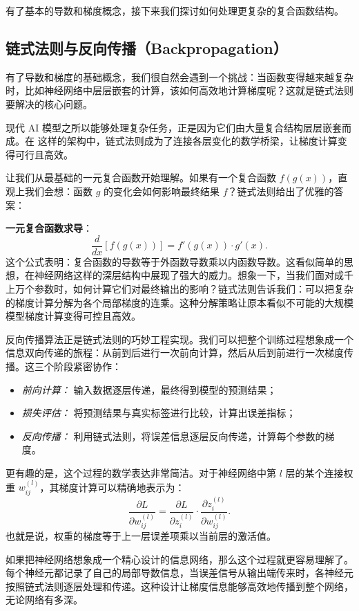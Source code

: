 有了基本的导数和梯度概念，接下来我们探讨如何处理更复杂的复合函数结构。

\subsection{链式法则与反向传播（Backpropagation）}

有了导数和梯度的基础概念，我们很自然会遇到一个挑战：当函数变得越来越复杂时，比如神经网络中层层嵌套的计算，该如何高效地计算梯度呢？这就是链式法则要解决的核心问题。

现代 AI 模型之所以能够处理复杂任务，正是因为它们由大量复合结构层层嵌套而成。在
这样的架构中，链式法则成为了连接各层变化的数学桥梁，让梯度计算变得可行且高效。

让我们从最基础的一元复合函数开始理解。如果有一个复合函数 $f(g(x))$，直观上我们会想：函数 $g$ 的变化会如何影响最终结果 $f$？链式法则给出了优雅的答案：

\textbf{一元复合函数求导}：
$$\frac{d}{dx}[f(g(x))] = f'(g(x)) \cdot g'(x).$$
这个公式表明：复合函数的导数等于外函数导数乘以内函数导数。这看似简单的思想，在神经网络这样的深层结构中展现了强大的威力。想象一下，当我们面对成千上万个参数时，如何计算它们对最终输出的影响？链式法则告诉我们：可以把复杂的梯度计算分解为各个局部梯度的连乘。这种分解策略让原本看似不可能的大规模模型梯度计算变得可控且高效。

反向传播算法正是链式法则的巧妙工程实现。我们可以把整个训练过程想象成一个信息双向传递的旅程：从前到后进行一次前向计算，然后从后到前进行一次梯度传播。这三个阶段紧密协作：

\begin{itemize}
  \item \emph{前向计算：} 输入数据逐层传递，最终得到模型的预测结果；
  \item \emph{损失评估：} 将预测结果与真实标签进行比较，计算出误差指标；
  \item \emph{反向传播：} 利用链式法则，将误差信息逐层反向传递，计算每个参数的梯度。
\end{itemize}

更有趣的是，这个过程的数学表达非常简洁。对于神经网络中第 $l$ 层的某个连接权重 $w_{ij}^{(l)}$，其梯度计算可以精确地表示为：
$$
\frac{\partial L}{\partial w_{ij}^{(l)}} = \frac{\partial L}{\partial z_i^{(l)}} \cdot \frac{\partial z_i^{(l)}}{\partial w_{ij}^{(l)}}.
$$
也就是说，权重的梯度等于上一层误差项乘以当前层的激活值。

如果把神经网络想象成一个精心设计的信息网络，那么这个过程就更容易理解了。每个神经元都记录了自己的局部导数信息，当误差信号从输出端传来时，各神经元按照链式法则逐层处理和传递。这种设计让梯度信息能够高效地传播到整个网络，无论网络有多深。

